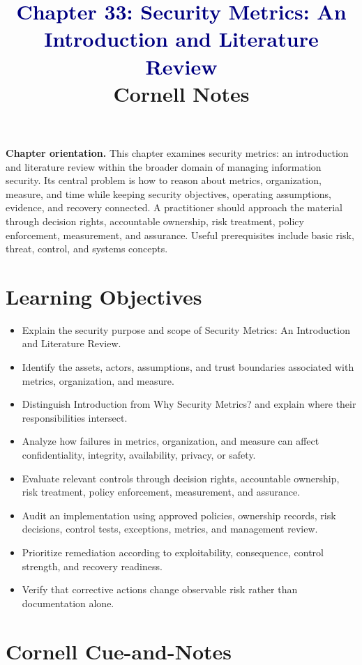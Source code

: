 \documentclass[11pt]{article}
\title{\textcolor{Navy}{Chapter 33: Security Metrics: An Introduction and Literature Review}\\[2mm]\large Cornell Notes}
\author{}
\date{}
\begin{document}
\maketitle
\thispagestyle{fancy}
\vspace{-1.5em}
\begin{orientationbox}
\textbf{Chapter orientation.} This chapter examines security metrics: an introduction and literature review within the broader domain of managing information security. Its central problem is how to reason about metrics, organization, measure, and time while keeping security objectives, operating assumptions, evidence, and recovery connected. A practitioner should approach the material through decision rights, accountable ownership, risk treatment, policy enforcement, measurement, and assurance. Useful prerequisites include basic risk, threat, control, and systems concepts.
\end{orientationbox}
\section*{Learning Objectives}
\begin{itemize}
\item Explain the security purpose and scope of Security Metrics: An Introduction and Literature Review.
\item Identify the assets, actors, assumptions, and trust boundaries associated with metrics, organization, and measure.
\item Distinguish Introduction from Why Security Metrics? and explain where their responsibilities intersect.
\item Analyze how failures in metrics, organization, and measure can affect confidentiality, integrity, availability, privacy, or safety.
\item Evaluate relevant controls through decision rights, accountable ownership, risk treatment, policy enforcement, measurement, and assurance.
\item Audit an implementation using approved policies, ownership records, risk decisions, control tests, exceptions, metrics, and management review.
\item Prioritize remediation according to exploitability, consequence, control strength, and recovery readiness.
\item Verify that corrective actions change observable risk rather than documentation alone.
\end{itemize}
\section*{Cornell Cue-and-Notes}
\end{document}
